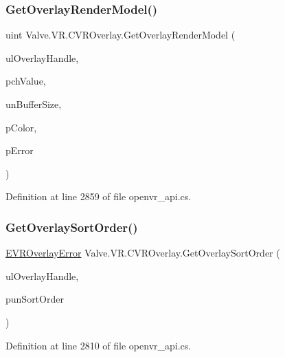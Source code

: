 \subsubsection{\texorpdfstring{GetOverlayRenderModel()}{GetOverlayRenderModel()}}
{\footnotesize\ttfamily uint Valve.\+V\+R.\+C\+V\+R\+Overlay.\+Get\+Overlay\+Render\+Model (\begin{DoxyParamCaption}\item[{ulong}]{ul\+Overlay\+Handle,  }\item[{System.\+Text.\+String\+Builder}]{pch\+Value,  }\item[{uint}]{un\+Buffer\+Size,  }\item[{ref \mbox{\hyperlink{struct_valve_1_1_v_r_1_1_hmd_color__t}{Hmd\+Color\+\_\+t}}}]{p\+Color,  }\item[{ref \mbox{\hyperlink{namespace_valve_1_1_v_r_aaee5c5144f42b7969d45b854f51b0c18}{E\+V\+R\+Overlay\+Error}}}]{p\+Error }\end{DoxyParamCaption})}



Definition at line 2859 of file openvr\+\_\+api.\+cs.

\mbox{\label{class_valve_1_1_v_r_1_1_c_v_r_overlay_a94c15b933d503b6ee5202ec86af44455}} 
\subsubsection{\texorpdfstring{GetOverlaySortOrder()}{GetOverlaySortOrder()}}
{\footnotesize\ttfamily \mbox{\hyperlink{namespace_valve_1_1_v_r_aaee5c5144f42b7969d45b854f51b0c18}{E\+V\+R\+Overlay\+Error}} Valve.\+V\+R.\+C\+V\+R\+Overlay.\+Get\+Overlay\+Sort\+Order (\begin{DoxyParamCaption}\item[{ulong}]{ul\+Overlay\+Handle,  }\item[{ref uint}]{pun\+Sort\+Order }\end{DoxyParamCaption})}



Definition at line 2810 of file openvr\+\_\+api.\+cs.

\mbox{\label{class_valve_1_1_v_r_1_1_c_v_r_overlay_aa8a1e4190b56b2cf528b57b660719ebf}} 
